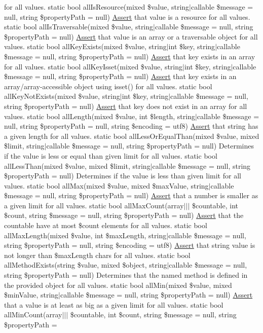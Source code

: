 for all values.  static bool all\+Is\+Resource(mixed \$value, string$\vert$callable \$message = null, string \$property\+Path = null) \mbox{\hyperlink{class_assert_1_1_assert}{Assert}} that value is a resource for all values.  static bool all\+Is\+Traversable(mixed \$value, string$\vert$callable \$message = null, string \$property\+Path = null) \mbox{\hyperlink{class_assert_1_1_assert}{Assert}} that value is an array or a traversable object for all values.  static bool all\+Key\+Exists(mixed \$value, string$\vert$int \$key, string$\vert$callable \$message = null, string \$property\+Path = null) \mbox{\hyperlink{class_assert_1_1_assert}{Assert}} that key exists in an array for all values.  static bool all\+Key\+Isset(mixed \$value, string$\vert$int \$key, string$\vert$callable \$message = null, string \$property\+Path = null) \mbox{\hyperlink{class_assert_1_1_assert}{Assert}} that key exists in an array/array-\/accessible object using isset() for all values.  static bool all\+Key\+Not\+Exists(mixed \$value, string$\vert$int \$key, string$\vert$callable \$message = null, string \$property\+Path = null) \mbox{\hyperlink{class_assert_1_1_assert}{Assert}} that key does not exist in an array for all values.  static bool all\+Length(mixed \$value, int \$length, string$\vert$callable \$message = null, string \$property\+Path = null, string \$encoding = \textquotesingle{}utf8\textquotesingle{}) \mbox{\hyperlink{class_assert_1_1_assert}{Assert}} that string has a given length for all values.  static bool all\+Less\+Or\+Equal\+Than(mixed \$value, mixed \$limit, string$\vert$callable \$message = null, string \$property\+Path = null) Determines if the value is less or equal than given limit for all values.  static bool all\+Less\+Than(mixed \$value, mixed \$limit, string$\vert$callable \$message = null, string \$property\+Path = null) Determines if the value is less than given limit for all values.  static bool all\+Max(mixed \$value, mixed \$max\+Value, string$\vert$callable \$message = null, string \$property\+Path = null) \mbox{\hyperlink{class_assert_1_1_assert}{Assert}} that a number is smaller as a given limit for all values.  static bool all\+Max\+Count(array$\vert$$\vert$$\vert$ \$countable, int \$count, string \$message = null, string \$property\+Path = null) \mbox{\hyperlink{class_assert_1_1_assert}{Assert}} that the countable have at most \$count elements for all values.  static bool all\+Max\+Length(mixed \$value, int \$max\+Length, string$\vert$callable \$message = null, string \$property\+Path = null, string \$encoding = \textquotesingle{}utf8\textquotesingle{}) \mbox{\hyperlink{class_assert_1_1_assert}{Assert}} that string value is not longer than \$max\+Length chars for all values.  static bool all\+Method\+Exists(string \$value, mixed \$object, string$\vert$callable \$message = null, string \$property\+Path = null) Determines that the named method is defined in the provided object for all values.  static bool all\+Min(mixed \$value, mixed \$min\+Value, string$\vert$callable \$message = null, string \$property\+Path = null) \mbox{\hyperlink{class_assert_1_1_assert}{Assert}} that a value is at least as big as a given limit for all values.  static bool all\+Min\+Count(array$\vert$$\vert$$\vert$ \$countable, int \$count, string \$message = null, string \$property\+Path = 